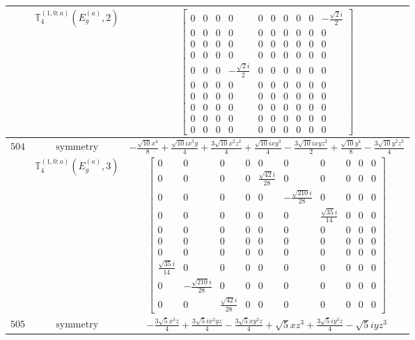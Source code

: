 \documentclass[fleqn,8pt,landscape]{jsarticle}
\begin{document}
\begin{longtable}{ccc}
$  $ & $ \mathbb{T}_{4}^{(1,0;a)}(E_{g}^{(a)},2) $ & $ \begin{bmatrix} 0 & 0 & 0 & 0 & 0 & 0 & 0 & 0 & 0 & - \frac{\sqrt{2} i}{2} \\ 0 & 0 & 0 & 0 & 0 & 0 & 0 & 0 & 0 & 0 \\ 0 & 0 & 0 & 0 & 0 & 0 & 0 & 0 & 0 & 0 \\ 0 & 0 & 0 & 0 & 0 & 0 & 0 & 0 & 0 & 0 \\ 0 & 0 & 0 & - \frac{\sqrt{2} i}{2} & 0 & 0 & 0 & 0 & 0 & 0 \\ 0 & 0 & 0 & 0 & 0 & 0 & 0 & 0 & 0 & 0 \\ 0 & 0 & 0 & 0 & 0 & 0 & 0 & 0 & 0 & 0 \\ 0 & 0 & 0 & 0 & 0 & 0 & 0 & 0 & 0 & 0 \\ 0 & 0 & 0 & 0 & 0 & 0 & 0 & 0 & 0 & 0 \\ 0 & 0 & 0 & 0 & 0 & 0 & 0 & 0 & 0 & 0 \end{bmatrix} $ \\ \hline
$ 504 $ & $ \text{symmetry} $ & $ - \frac{\sqrt{10} x^{4}}{8} + \frac{\sqrt{10} i x^{3} y}{4} + \frac{3 \sqrt{10} x^{2} z^{2}}{4} + \frac{\sqrt{10} i x y^{3}}{4} - \frac{3 \sqrt{10} i x y z^{2}}{2} + \frac{\sqrt{10} y^{4}}{8} - \frac{3 \sqrt{10} y^{2} z^{2}}{4} $ \\
$  $ & $ \mathbb{T}_{4}^{(1,0;a)}(E_{g}^{(a)},3) $ & $ \begin{bmatrix} 0 & 0 & 0 & 0 & 0 & 0 & 0 & 0 & 0 & 0 \\ 0 & 0 & 0 & 0 & \frac{\sqrt{42} i}{28} & 0 & 0 & 0 & 0 & 0 \\ 0 & 0 & 0 & 0 & 0 & - \frac{\sqrt{210} i}{28} & 0 & 0 & 0 & 0 \\ 0 & 0 & 0 & 0 & 0 & 0 & \frac{\sqrt{35} i}{14} & 0 & 0 & 0 \\ 0 & 0 & 0 & 0 & 0 & 0 & 0 & 0 & 0 & 0 \\ 0 & 0 & 0 & 0 & 0 & 0 & 0 & 0 & 0 & 0 \\ 0 & 0 & 0 & 0 & 0 & 0 & 0 & 0 & 0 & 0 \\ \frac{\sqrt{35} i}{14} & 0 & 0 & 0 & 0 & 0 & 0 & 0 & 0 & 0 \\ 0 & - \frac{\sqrt{210} i}{28} & 0 & 0 & 0 & 0 & 0 & 0 & 0 & 0 \\ 0 & 0 & \frac{\sqrt{42} i}{28} & 0 & 0 & 0 & 0 & 0 & 0 & 0 \end{bmatrix} $ \\ \hline
$ 505 $ & $ \text{symmetry} $ & $ - \frac{3 \sqrt{5} x^{3} z}{4} + \frac{3 \sqrt{5} i x^{2} y z}{4} - \frac{3 \sqrt{5} x y^{2} z}{4} + \sqrt{5} x z^{3} + \frac{3 \sqrt{5} i y^{3} z}{4} - \sqrt{5} i y z^{3} $ \\

\end{longtable}
\end{document}
